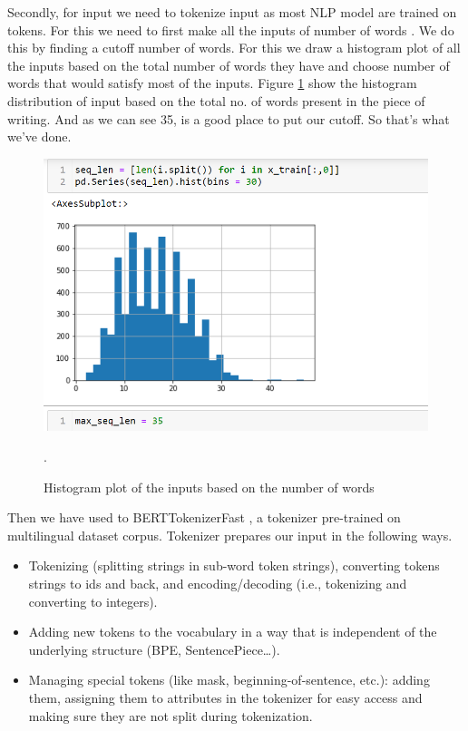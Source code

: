 \documentclass[a4paper, 12pt]{article}
\begin{document}
\begin{sloppypar}
 Secondly, for input we need to tokenize input as most NLP model are trained on tokens. For this we need to first make all the inputs of number of words . We do this by finding a cutoff number of words. For this we draw a histogram plot of all the inputs based on the total number of words they have and choose number of words that would satisfy most of the inputs. Figure \ref{plot} show the histogram distribution of input based on the total no. of words present in the piece of writing. And as we can see 35, is a good place to put our  cutoff. So that's what we've done. 
 
 \begin{figure}[H]
 \begin{center}
 \includegraphics[scale=0.65]{maxlen.png}
 \caption{Histogram plot of the inputs based on the number of words\label{plot}}.
 \end{center}
 \end{figure}
 Then we have used to BERTTokenizerFast , a tokenizer pre-trained on multilingual dataset corpus. Tokenizer prepares our input in the following ways.
 \begin{itemize}
 \item{Tokenizing (splitting strings in sub-word token strings), converting tokens strings to ids and back, and encoding/decoding (i.e., tokenizing and converting to integers).}\cite{noauthor_tokenizer_nodate}

\item{Adding new tokens to the vocabulary in a way that is independent of the underlying structure (BPE, SentencePiece…).}\cite{noauthor_tokenizer_nodate}

\item{Managing special tokens (like mask, beginning-of-sentence, etc.): adding them, assigning them to attributes in the tokenizer for easy access and making sure they are not split during tokenization.}\cite{noauthor_tokenizer_nodate}
 \end{itemize}
 

\end{sloppypar}
\end{document}
